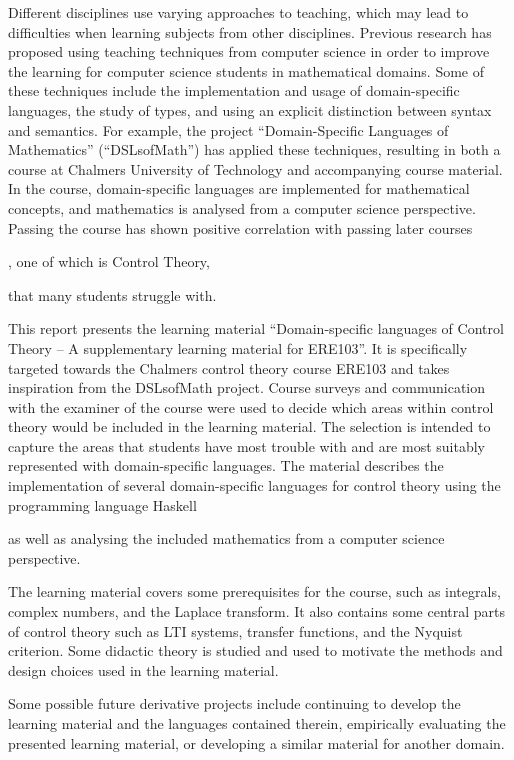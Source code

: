 \noindent
Different disciplines use varying approaches to teaching, which may lead to difficulties when learning subjects from other disciplines. Previous research has proposed using teaching techniques from computer science in order to improve the learning for computer science students in mathematical domains. Some of these techniques include the implementation and usage of domain-specific languages, the study of types, and using an explicit distinction between syntax and semantics. 
For example, the project ``Domain-Specific Languages of Mathematics'' (``DSLsofMath'') has applied these techniques, resulting in both a course at Chalmers University of Technology and accompanying course material. In the course, domain-specific languages are implemented for mathematical concepts, and mathematics is analysed from a computer science perspective. Passing the course has shown positive correlation with passing later courses\begin{newtext}, one of which is Control Theory, \end{newtext} that many students struggle with. 

This report presents the learning material ``Domain-specific languages of Control Theory -- A supplementary learning material for ERE103''. It is specifically targeted towards the Chalmers control theory course ERE103 and takes inspiration from the DSLsofMath project. Course surveys and communication with the examiner of the course were used to decide which areas within control theory would be included in the learning material. The selection is intended to capture the areas that students have most trouble with and are most suitably represented with domain-specific languages. The material describes the implementation of several domain-specific languages for control theory using the programming language Haskell 
\begin{modtext}as well as analysing the included mathematics from a computer science perspective.
\end{modtext} 
The learning material covers some prerequisites for the course, such as integrals, complex numbers, and the Laplace transform. It also contains some central parts of control theory such as LTI systems, transfer functions, and the Nyquist criterion. Some didactic theory is studied and used to motivate the methods and design choices used in the learning material.

Some possible future derivative projects include continuing to develop the learning material and the languages contained therein, empirically evaluating the presented learning material, or developing a similar material for another domain.

